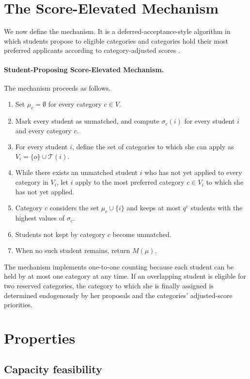 \documentclass[10pt]{article}
\newcommand{\T}{\mathcal{T}}
\newcommand{\1}{\mathbf{1}}
\begin{document}
\section{The Score-Elevated Mechanism}

We now define the mechanism. It is a deferred-acceptance-style algorithm in which students propose to eligible categories and categories hold their most preferred applicants according to category-adjusted scores \citep{GaSh62a,Roth08a}.

\paragraph{Student-Proposing Score-Elevated Mechanism.}
The mechanism proceeds as follows.

\begin{enumerate}
\item Set $\mu_c=\emptyset$ for every category $c\in V$.
\item Mark every student as unmatched, and compute $\sigma_c(i)$ for every student $i$ and every category $c$.
\item For every student $i$, define the set of categories to which she can apply as $V_i=\{o\}\cup\T(i)$.
\item While there exists an unmatched student $i$ who has not yet applied to every category in $V_i$, let $i$ apply to the most preferred category $c\in V_i$ to which she has not yet applied.
\item Category $c$ considers the set $\mu_c\cup\{i\}$ and keeps at most $q^c$ students with the highest values of $\sigma_c$.
\item Students not kept by category $c$ become unmatched.
\item When no such student remains, return $M(\mu)$.
\end{enumerate}

The mechanism implements one-to-one counting because each student can be held by at most one category at any time. If an overlapping student is eligible for two reserved categories, the category to which she is finally assigned is determined endogenously by her proposals and the categories' adjusted-score priorities.

\section{Properties}

\subsection{Capacity feasibility}
\end{document}
